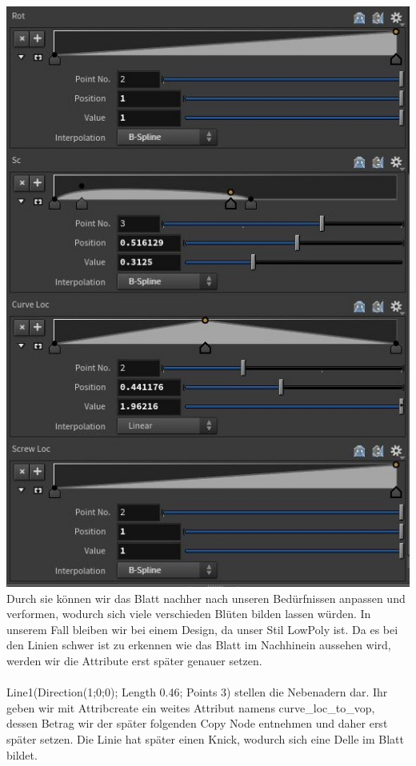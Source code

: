 \documentclass[paper=a4,fontsize=12pt,ngerman]{scrartcl}
\begin{document}
	\includegraphics*[scale=0.55]{graphics/wrangle.jpg}\\
	Durch sie können wir das Blatt nachher nach unseren Bedürfnissen anpassen und verformen, wodurch sich viele verschieden Blüten bilden lassen würden. In unserem Fall bleiben wir bei einem Design, da unser Stil LowPoly ist. Da es bei den Linien schwer ist zu erkennen wie das Blatt im Nachhinein aussehen wird, werden wir die Attribute erst später genauer setzen.\\ \\
	Line1(Direction(1;0;0); Length 0.46; Points 3) stellen die Nebenadern dar. Ihr geben wir mit Attribcreate ein weites Attribut namens curve\_loc\_to\_vop, dessen Betrag wir der später folgenden Copy Node entnehmen und daher erst später setzen. Die Linie hat später einen Knick, wodurch sich eine Delle im Blatt bildet.\\ \\
\end{document}
